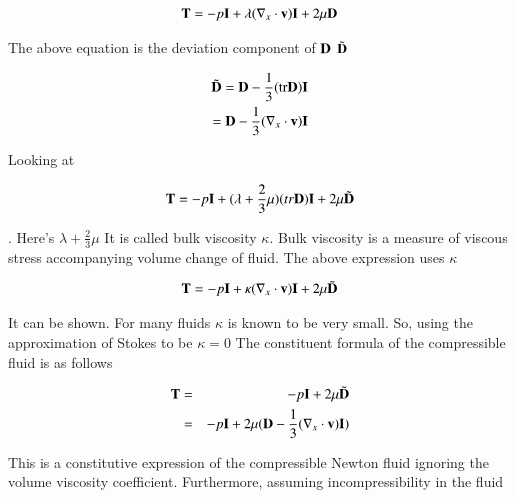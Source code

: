 
\begin{tcolorbox}[title=Newton structural formula of the fluid]
\begin{eqnarray}
\mathbf{T} = -p {\mathbf{I}} + \lambda(\nabla_x \cdot {\mathbf{v}}){\mathbf{I}} + 2\mu{\mathbf{D}}
\end{eqnarray}
\end{tcolorbox}


The above equation is the deviation component of $\mathbf{D}$ $\tilde{\mathbf{D}}$

\begin{eqnarray}
\tilde{\mathbf{D}}
=  {\mathbf{D}} - \frac{1}{3}(\mathrm{tr}{\mathbf{D}}){\mathbf{I}}\\
=  {\mathbf{D}} - \frac{1}{3}(\nabla_x \cdot {\mathbf{v}}){\mathbf{I}}
\end{eqnarray}

Looking at

\begin{eqnarray}
{\mathbf{T}}  = -p{\mathbf{I}} + (\lambda+\frac{2}{3}\mu)(tr{\mathbf{D}}){\mathbf{I}}+2\mu\tilde{\mathbf{D}}
\end{eqnarray}

. Here's $\lambda+\frac{2}{3}\mu$
It is called bulk viscosity $\kappa$.
Bulk viscosity is a measure of viscous stress accompanying volume change of fluid.
The above expression uses $\kappa$

\begin{eqnarray}
{\mathbf{T}} = -p{\mathbf{I}} + \kappa(\nabla_x \cdot {\mathbf{v}}){\mathbf{I}}+2\mu\tilde{\mathbf{D}}
\end{eqnarray}

It can be shown.
For many fluids $\kappa$ is known to be very small.
So, using the approximation of Stokes to be $\kappa=0$
The constituent formula of the compressible fluid is as follows

\begin{eqnarray}
{\mathbf{T}}
&=&  -p{\mathbf{I}} + 2\mu\tilde{\mathbf{D}}\\
&=&  -p{\mathbf{I}}+2\mu( {\mathbf{D}} - \frac{1}{3}(\nabla_x \cdot {\mathbf{v}}){\mathbf{I}} )
\end{eqnarray}

This is a constitutive expression of the compressible Newton fluid ignoring the volume viscosity coefficient.
Furthermore, assuming incompressibility in the fluid

